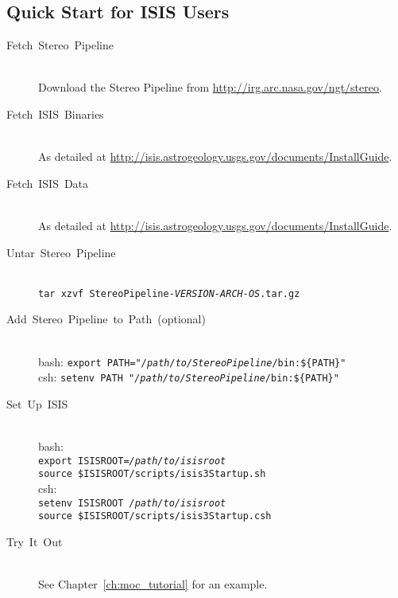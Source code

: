 \subsection{Quick Start for ISIS Users}
\begin{description}

\item[{Fetch~Stereo~Pipeline}] ~\\
Download the Stereo Pipeline from \url{http://irg.arc.nasa.gov/ngt/stereo}.

\item [{Fetch~ISIS~Binaries}] ~\\
As detailed at \url{http://isis.astrogeology.usgs.gov/documents/InstallGuide}.

\item [{Fetch~ISIS~Data}] ~\\
As detailed at \url{http://isis.astrogeology.usgs.gov/documents/InstallGuide}.

\item [{Untar~Stereo~Pipeline}] ~\\
\texttt{tar xzvf StereoPipeline-\textit{VERSION-ARCH-OS}.tar.gz}

\item [{Add~Stereo~Pipeline~to~Path~(optional)}] ~\\
bash: \texttt{export PATH="\textit{/path/to/StereoPipeline}/bin:\$\{PATH\}"} \\
csh:  \texttt{setenv PATH "\textit{/path/to/StereoPipeline}/bin:\$\{PATH\}"}

\item[Set~Up~ISIS] ~\\
bash: \\
\hspace*{2em}\texttt{export ISISROOT=\textit{/path/to/isisroot}} \\
\hspace*{2em}\texttt{source \$ISISROOT/scripts/isis3Startup.sh} \\
csh: \\
\hspace*{2em}\texttt{setenv ISISROOT \textit{/path/to/isisroot}} \\
\hspace*{2em}\texttt{source \$ISISROOT/scripts/isis3Startup.csh}

\item [{Try~It~Out}] ~\\
See Chapter~\ref{ch:moc_tutorial} for an example.
\end{description}

